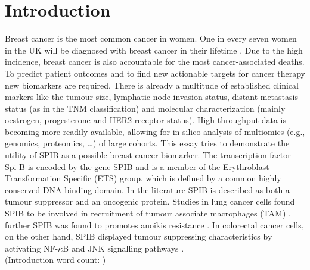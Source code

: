 \section{Introduction}
\countem

Breast cancer is the most common cancer in women.
One in every seven women in the UK will be diagnosed with breast cancer in their lifetime \cite{cancerresearchuk_2021}. 
Due to the high incidence, breast cancer is also accountable for the most cancer-associated deaths.
To predict patient outcomes and to find new actionable targets for cancer therapy new biomarkers are required.
There is already a multitude of established clinical markers like the tumour size, lymphatic node invasion status, distant metastasis status (as in the TNM classification) and molecular characterization (mainly oestrogen, progesterone and HER2 receptor status).
High throughput data is becoming more readily available, allowing for in silico analysis of multiomics (e.g., genomics, proteomics, \ldots) of large cohorts.
This essay tries to demonstrate the utility of SPIB as a possible breast cancer biomarker.
The transcription factor Spi-B is encoded by the gene SPIB and is a member of the Erythroblast Transformation Specific (ETS) group, which is defined by a common highly conserved DNA-binding domain.
In the literature SPIB is described as both a tumour suppressor and an oncogenic protein.
Studies in lung cancer cells found SPIB to be involved in recruitment of tumour associate macrophages (TAM) \cite{Huang2021}, further SPIB was found to promotes anoikis resistance \cite{Zhang2020}.
In colorectal cancer cells, on the other hand, SPIB displayed tumour suppressing characteristics by activating NF-$\kappa$B and JNK signalling pathways \cite{Zhao2021}.
\\
\endcountem 
(Introduction word count: \thewordcount{})